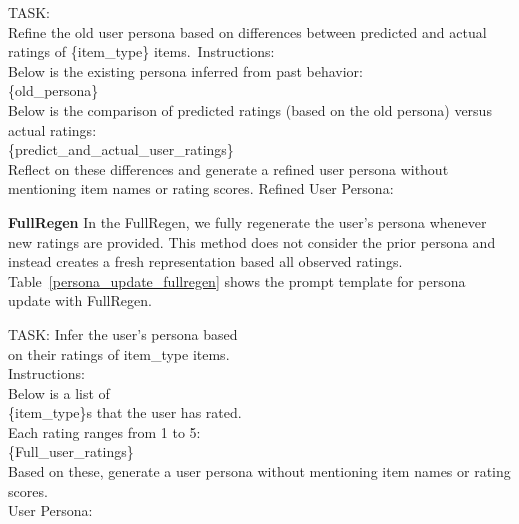     \begin{tcolorbox} 
        {\selectfont\small 
        TASK: \\
        Refine the old user persona based on differences 
        between predicted and actual ratings of \{item\_type\} 
        items.\ Instructions: \\
        Below is the existing persona 
        inferred from past behavior:\\
        \{old\_persona\} \\
        Below is the comparison of predicted ratings (based on the old persona) 
        versus actual ratings:\\
        \{predict\_and\_actual\_user\_ratings\}\\
        Reflect on these differences and generate a refined 
        user persona without mentioning item names or rating scores.
        Refined User Persona:

        }
        \end{tcolorbox}
        \noindent\begin{minipage}{0.48\textwidth}
        \label{persona_refinement_method_deeper}
        \end{minipage}
        

\textbf{FullRegen}
In the FullRegen, we fully regenerate the user's persona whenever new ratings are provided. This method does not consider the prior persona and instead creates a fresh representation based all observed ratings. Table~\ref{persona_update_fullregen} shows the prompt template for persona update with FullRegen.

\begin{tcolorbox}
    {\selectfont\small
    TASK: Infer the user's persona based \\
    on their ratings of {item\_type} items.\\
    Instructions: \\
    Below is a list of \\
    \{item\_type\}s that the user has rated. \\
    Each rating ranges from 1 to 5:\\
    \{Full\_user\_ratings\}\\
    
    Based on these, generate a user persona without mentioning item names or rating scores. 
\\
    User Persona:
}
    \end{tcolorbox}
\noindent\begin{minipage}{0.48\textwidth}
\label{persona_update_fullregen}
\end{minipage}




